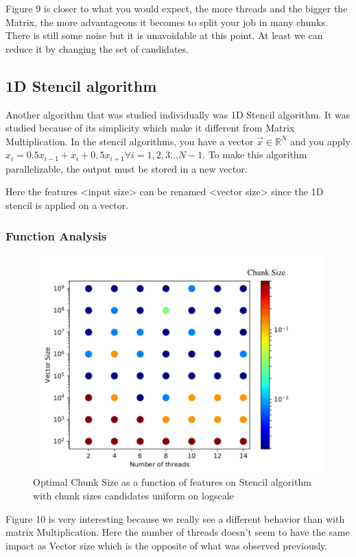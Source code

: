 Figure 9 is closer to what you would expect, the more threads and the bigger the Matrix, the more advantageous it becomes to split your job in many chunks. There is still some noise but it is unavoidable at this point. At least we can reduce it by changing the set of candidates.
\subsection{1D Stencil algorithm}

Another algorithm that was studied individually was 1D Stencil algorithm. It was studied because of its simplicity which make it different from Matrix Multiplication. In the stencil algorithms, you have a vector $\vec{x} \in \mathbb{R}^N$ and you apply $x_i=0.5x_{i-1}+x_i+0,5x_{i+1} \forall i=1,2,3...N-1$. To make this algorithm parallelizable, the output must be stored in a new vector.

Here the features <input size> can be renamed <vector size> since the 1D stencil is applied on a vector.
\newpage
\subsubsection{Function Analysis}

\begin{figure}[h]
	\centering
	\includegraphics[scale=0.8]{images/stencil_function.pdf}
	\caption{Optimal Chunk Size as a function of features on Stencil algorithm with chunk sizes candidates uniform on logscale}
\end{figure}
Figure 10 is very interesting because we really see a different behavior than with matrix Multiplication. Here the number of threads doesn't seem to have the same impact as Vector size which is the opposite of what was observed previously.

